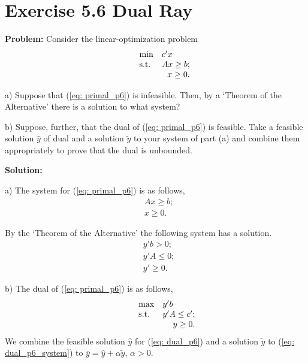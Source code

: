 \section{Exercise 5.6 Dual Ray}
\textbf{Problem:} Consider the linear-optimization problem
\begin{equation}
\label{eq: primal_p6}
  \begin{array}{lrcll}
    \min
    & \multicolumn{4}{l}{c'x} \\
    \text{s.t.}
    & Ax\geq b; \\
    & x \geq 0.
  \end{array}
\end{equation}

a) Suppose that (\ref{eq: primal_p6}) is infeasible. Then, by a `Theorem of the Alternative' there is a
solution to what system?

b) Suppose, further, that the dual of (\ref{eq: primal_p6}) is feasible. Take a feasible solution $\widehat{y}$ of dual and a solution $\tilde{y}$ to your system of part (a) and combine them appropriately to prove that the dual is unbounded.

\textbf{Solution:}

a) The system for (\ref{eq: primal_p6}) is as follows,
\begin{equation}
\label{eq: primal_p6_system}
  \begin{array}{lrcll}
    & Ax\geq b; \\
    & x \geq 0.
  \end{array}
\end{equation}

By the `Theorem of the Alternative' the following system has a solution.
\begin{equation}
\label{eq: dual_p6_system}
  \begin{array}{lrcll}
    & y'b>0; \\
    & y'A\leq{}0; \\
    & y'\geq0.
  \end{array}
\end{equation}

b) The dual of (\ref{eq: primal_p6}) is as follows,
\begin{equation}
\label{eq: dual_p6}
  \begin{array}{lrcll}
    \max
    & \multicolumn{4}{l}{y'b} \\
    \text{s.t.}
    & y'A\leq c'; \\
    & y \geq 0.
  \end{array}
\end{equation}
We combine the feasible solution $\widehat{y}$ for (\ref{eq: dual_p6}) and a solution $\tilde{y}$ to (\ref{eq: dual_p6_system}) to $\overline{y}=\widehat{y}+\alpha\tilde{y}$, $\alpha>0$.


